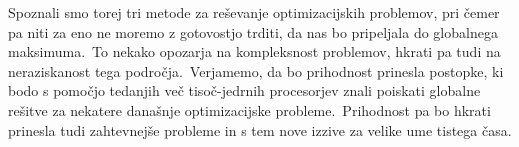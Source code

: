 \documentclass[a4paper,10pt]{article}
\begin{document}
Spoznali smo torej tri metode za reševanje optimizacijskih problemov, pri čemer pa niti za eno
ne moremo z gotovostjo trditi, da nas bo pripeljala do globalnega maksimuma.\ To nekako opozarja
na kompleksnost problemov, hkrati pa tudi na neraziskanost tega področja.\ Verjamemo, da bo
prihodnost prinesla postopke, ki bodo s pomočjo tedanjih več tisoč-jedrnih procesorjev znali
poiskati globalne rešitve za nekatere današnje optimizacijske probleme.\ Prihodnost pa bo
hkrati prinesla tudi zahtevnejše probleme in s tem nove izzive za velike ume tistega časa.
\end{document}
